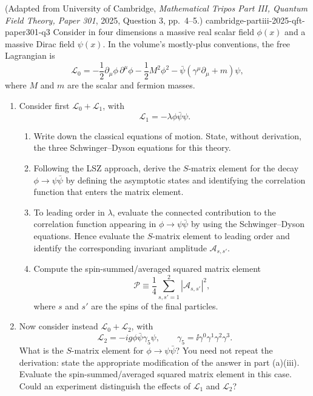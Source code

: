 \begin{enumerate}
  {(Adapted from University of Cambridge, \emph{Mathematical Tripos Part III, Quantum Field Theory, Paper 301}, 2025, Question 3, pp.~4--5.)}
  {cambridge-partiii-2025-qft-paper301-q3}
Consider in four dimensions a massive real scalar field \(\phi(x)\) and a
massive Dirac field \(\psi(x)\).  In the volume's mostly-plus conventions,
the free Lagrangian is
\[
 \mathcal L_0=-\frac12\partial_\mu\phi\,\partial^\mu\phi
 -\frac12M^2\phi^2-\bar\psi(\gamma^\mu\partial_\mu+m)\psi,
\]
where \(M\) and \(m\) are the scalar and fermion masses.
\begin{enumerate}
\item
Consider first \(\mathcal L_0+\mathcal L_1\), with
\[
 \mathcal L_1=-\lambda\phi\bar\psi\psi.
\]
\begin{enumerate}
\item
Write down the classical equations of motion.  State, without derivation,
the three Schwinger--Dyson equations for this theory.
\item
Following the LSZ approach, derive the \(S\)-matrix element for the decay
\(\phi\to\psi\bar\psi\) by defining the asymptotic states and identifying
the correlation function that enters the matrix element.
\item
To leading order in \(\lambda\), evaluate the connected contribution to
the correlation function appearing in \(\phi\to\psi\bar\psi\) by using
the Schwinger--Dyson equations.  Hence evaluate the \(S\)-matrix element
to leading order and identify the corresponding invariant amplitude
\(\mathcal A_{s,s'}\).
\item
Compute the spin-summed/averaged squared matrix element
\[
 \mathcal P\equiv\frac14\sum_{s,s'=1}^{2}
 \left|\mathcal A_{s,s'}\right|^2,
\]
where \(s\) and \(s'\) are the spins of the final particles.
\end{enumerate}
\item
Now consider instead \(\mathcal L_0+\mathcal L_2\), with
\[
 \mathcal L_2=-ig\phi\bar\psi\gamma_5\psi,
 \qquad \gamma_5=\ii\gamma^0\gamma^1\gamma^2\gamma^3.
\]
What is the \(S\)-matrix element for \(\phi\to\psi\bar\psi\)?  You need
not repeat the derivation: state the appropriate modification of the
answer in part (a)(iii).  Evaluate the spin-summed/averaged squared matrix
element in this case.  Could an experiment distinguish the effects of
\(\mathcal L_1\) and \(\mathcal L_2\)?
\end{enumerate}


\end{enumerate}

